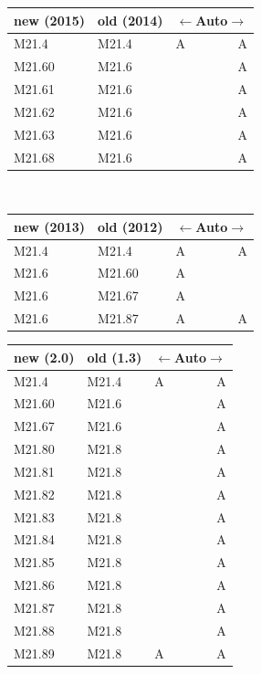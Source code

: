 \begin{minipage}[t]{.5\textwidth}\vspace{0pt}
%
\begingroup
\begin{tabular}{p{58pt}p{58pt}lr}
new (2015) & old (2014) & \multicolumn{2}{c}{$\leftarrow$Auto$\rightarrow$} \\
\hline
M21.4 & M21.4 & A & A \\
\hdashline[0.5pt/5pt]
M21.60 & M21.6 & & A \\
M21.61 & M21.6 & & A \\
M21.62 & M21.6 & & A \\
M21.63 & M21.6 & & A \\
M21.68 & M21.6 & & A \\
\end{tabular}
%

\ \\


%
\begin{tabular}{p{58pt}p{58pt}lr}
new (2013) & old (2012) & \multicolumn{2}{c}{$\leftarrow$Auto$\rightarrow$} \\
\hline
M21.4 & M21.4 & A & A \\
\hdashline[0.5pt/5pt]
M21.6 & M21.60 & A &  \\
M21.6 & M21.67 & A &  \\
M21.6 & M21.87 & A & A \\
\end{tabular}
\endgroup
%
\end{minipage}
\begin{minipage}[t]{.5\textwidth}%
%
\begingroup
\renewcommand{\arraystretch}{1.2}
\begin{tabular}[t]{p{58pt}p{58pt}lr}
new (2.0) & old (1.3) & \multicolumn{2}{c}{$\leftarrow$Auto$\rightarrow$} \\
\hline
M21.4 & M21.4 & A & A \\
\hdashline[0.5pt/5pt]
M21.60 & M21.6 &  & A \\
M21.67 & M21.6 &  & A \\
\hdashline[0.5pt/5pt]
M21.80 & M21.8 &  & A \\
M21.81 & M21.8 &  & A \\
M21.82 & M21.8 &  & A \\
M21.83 & M21.8 &  & A \\
M21.84 & M21.8 &  & A \\
M21.85 & M21.8 &  & A \\
M21.86 & M21.8 &  & A \\
M21.87 & M21.8 &  & A \\
M21.88 & M21.8 &  & A \\
M21.89 & M21.8 & A & A \\
\end{tabular}
\endgroup
%
\end{minipage}

